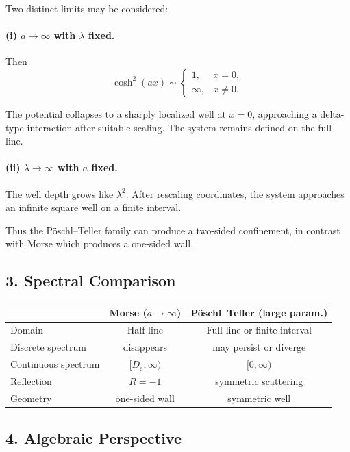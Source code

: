 \documentclass[11pt]{article}
\begin{document}
Two distinct limits may be considered:

\paragraph{(i) $a\to\infty$ with $\lambda$ fixed.}

Then
\[
\cosh^2(ax)\sim
\begin{cases}
1, & x=0,\\
\infty, & x\neq 0.
\end{cases}
\]

The potential collapses to a sharply localized well
at $x=0$,
approaching a delta-type interaction after suitable scaling.
The system remains defined on the full line.

\paragraph{(ii) $\lambda\to\infty$ with $a$ fixed.}

The well depth grows like $\lambda^2$.
After rescaling coordinates,
the system approaches an infinite square well on a finite interval.

Thus the P\"oschl--Teller family can produce
a two-sided confinement,
in contrast with Morse which produces a one-sided wall.

\subsection{3. Spectral Comparison}

\begin{center}
\begin{tabular}{lcc}
\hline
 & Morse ($a\to\infty$) & P\"oschl--Teller (large param.)\\
\hline
Domain & Half-line & Full line or finite interval \\
Discrete spectrum & disappears & may persist or diverge \\
Continuous spectrum & $[D_e,\infty)$ & $[0,\infty)$ \\
Reflection & $R=-1$ & symmetric scattering \\
Geometry & one-sided wall & symmetric well \\
\hline
\end{tabular}
\end{center}

\subsection{4. Algebraic Perspective}
\end{document}

